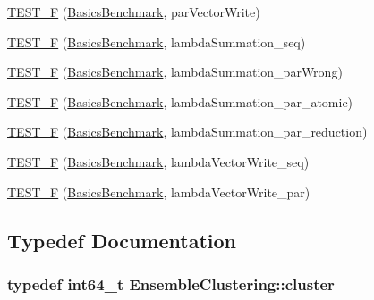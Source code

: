 \begin{DoxyCompactItemize}
\hyperlink{namespace_ensemble_clustering_a644fc24eed66e09e9f7db1d6be87cee6}{T\-E\-S\-T\-\_\-\-F} (\hyperlink{class_ensemble_clustering_1_1_basics_benchmark}{Basics\-Benchmark}, par\-Vector\-Write)
\item 
\hyperlink{namespace_ensemble_clustering_a4eda341f76ed61f8058e7e1133fdffc9}{T\-E\-S\-T\-\_\-\-F} (\hyperlink{class_ensemble_clustering_1_1_basics_benchmark}{Basics\-Benchmark}, lambda\-Summation\-\_\-seq)
\item 
\hyperlink{namespace_ensemble_clustering_af58ace3cc4c0f9c68bbf963000834d5f}{T\-E\-S\-T\-\_\-\-F} (\hyperlink{class_ensemble_clustering_1_1_basics_benchmark}{Basics\-Benchmark}, lambda\-Summation\-\_\-par\-Wrong)
\item 
\hyperlink{namespace_ensemble_clustering_af7da9c7e92ad5c31b81945794ce4f188}{T\-E\-S\-T\-\_\-\-F} (\hyperlink{class_ensemble_clustering_1_1_basics_benchmark}{Basics\-Benchmark}, lambda\-Summation\-\_\-par\-\_\-atomic)
\item 
\hyperlink{namespace_ensemble_clustering_a5cb4f0ad705308a7477167d9f044126c}{T\-E\-S\-T\-\_\-\-F} (\hyperlink{class_ensemble_clustering_1_1_basics_benchmark}{Basics\-Benchmark}, lambda\-Summation\-\_\-par\-\_\-reduction)
\item 
\hyperlink{namespace_ensemble_clustering_ae4d31b050410277fdb4424e207594aa5}{T\-E\-S\-T\-\_\-\-F} (\hyperlink{class_ensemble_clustering_1_1_basics_benchmark}{Basics\-Benchmark}, lambda\-Vector\-Write\-\_\-seq)
\item 
\hyperlink{namespace_ensemble_clustering_a4a339a5b6b28d4cc24ae2bd3d94fbd49}{T\-E\-S\-T\-\_\-\-F} (\hyperlink{class_ensemble_clustering_1_1_basics_benchmark}{Basics\-Benchmark}, lambda\-Vector\-Write\-\_\-par)
\end{DoxyCompactItemize}


\subsection{Typedef Documentation}
\hypertarget{namespace_ensemble_clustering_a5ae38234e207add524443be6e597b970}{
\subsubsection[{cluster}]{\setlength{\rightskip}{0pt plus 5cm}typedef int64\-\_\-t {\bf Ensemble\-Clustering\-::cluster}}}\label{namespace_ensemble_clustering_a5ae38234e207add524443be6e597b970}


